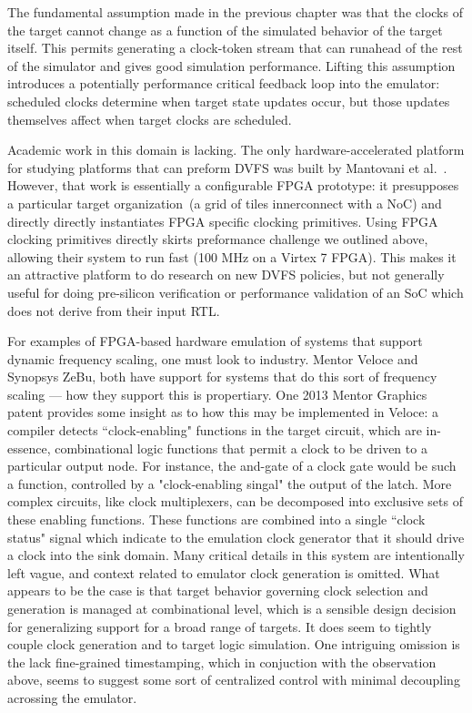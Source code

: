 
The fundamental assumption made in the previous chapter was that the clocks of
the target cannot change as a function of the simulated behavior of the target
itself. This permits generating a clock-token stream that can runahead of the
rest of the simulator and gives good simulation performance. Lifting this
assumption introduces a potentially performance critical feedback loop into the
emulator: scheduled clocks determine when target state updates occur, but those
updates themselves affect when target clocks are scheduled.

Academic work in this domain is lacking. The only hardware-accelerated platform
for studying platforms that can preform DVFS was built by Mantovani et
al.~\cite{DVFSPrototype}. However, that work is essentially a configurable FPGA
prototype: it presupposes a particular target organization~(a grid of tiles
innerconnect with a NoC) and directly directly instantiates FPGA specific
clocking primitives. Using FPGA clocking primitives directly skirts preformance
challenge we outlined above, allowing their system to run fast (100 MHz on a
Virtex 7 FPGA). This makes it an attractive platform to do research on new
DVFS policies, but not generally useful for doing pre-silicon verification or
performance validation of an SoC which does not derive from their input RTL.

For examples of FPGA-based hardware emulation of systems that support dynamic
frequency scaling, one must look to industry. Mentor Veloce and Synopsys ZeBu,
both have support for systems that do this sort of frequency scaling --- how
they support this is propertiary. One 2013 Mentor Graphics patent provides some
insight as to how this may be implemented in Veloce: a compiler detects
``clock-enabling" functions in the target circuit, which are in-essence,
combinational logic functions that permit a clock to be driven to a particular
output node. For instance, the and-gate of a clock gate would be such a
function, controlled by a "clock-enabling singal" the output of the latch. More
complex circuits, like clock multiplexers, can be decomposed into exclusive
sets of these enabling functions. These functions are combined into a single
``clock status" signal which indicate to the emulation clock generator that it
should drive a clock into the sink domain. Many critical details in this system
are intentionally left vague, and context related to emulator clock generation
is omitted.  What appears to be the case is that target behavior governing
clock selection and generation is managed at combinational level, which is a
sensible design decision for generalizing support for a broad range of targets.
It does seem to tightly couple clock generation and to target logic simulation.
One intriguing omission is the lack fine-grained timestamping, which in
conjuction with the observation above, seems to suggest some sort of
centralized control with minimal decoupling acrossing the emulator.

